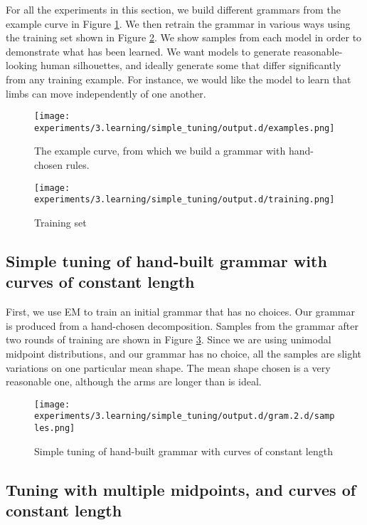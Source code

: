 
For all the experiments in this section, we build different grammars
from the example curve in Figure \ref{fig-romer-example}. We then
retrain the grammar in various ways using the training set shown in
Figure \ref{fig-romer-train}. We show samples from each model in order
to demonstrate what has been learned. We want models to generate
reasonable-looking human silhouettes, and ideally generate some that
differ significantly from any training example. For instance, we would
like the model to learn that limbs can move independently of one
another.

\begin{figure}
\texttt{[image: experiments/3.learning/simple\_tuning/output.d/examples.png]}
\caption{The example curve, from which we build a grammar with hand-chosen rules.}
\label{fig-romer-example}
\end{figure}

\begin{figure}
\texttt{[image: experiments/3.learning/simple\_tuning/output.d/training.png]}
\caption{Training set}
\label{fig-romer-train}
\end{figure}

\subsection{Simple tuning of hand-built grammar with curves of constant length}

First, we use EM to train an initial grammar that has no choices. Our
grammar is produced from a hand-chosen decomposition. Samples from the
grammar after two rounds of training are shown in Figure
\ref{fig-em-simple}. Since we are using unimodal midpoint
distributions, and our grammar has no choice, all the samples are
slight variations on one particular mean shape. The mean shape chosen
is a very reasonable one, although the arms are longer than is ideal.

\begin{figure}
\texttt{[image: experiments/3.learning/simple\_tuning/output.d/gram.2.d/samples.png]}
\caption{Simple tuning of hand-built grammar with curves of constant length}
\label{fig-em-simple}
\end{figure}

\subsection{Tuning with multiple midpoints, and curves of constant length}

